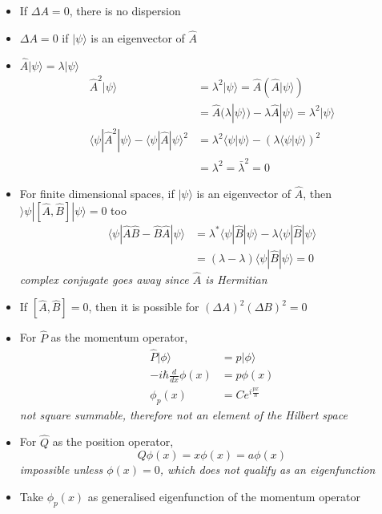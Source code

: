 \documentclass[a4paper,11pt,normalem]{article}
\begin{document}
\begin{itemize}
\item
  If \(\Delta A = 0\), there is no dispersion
\item
  \(\Delta A = 0\) if \(|\psi\rangle\) is an eigenvector of \(\hat{A}\)
\item
  \(\hat{A}|\psi\rangle = \lambda|\psi\rangle\)
\[
    \begin{aligned}
    \hat{A}^2|\psi\rangle &= \lambda^2|\psi\rangle = \hat{A}(\hat{A}|\psi\rangle) \\
    &= \hat{A}(\lambda|\psi\rangle) - \lambda\hat{A}|\psi\rangle = \lambda^2|\psi\rangle \\
    \langle\psi|\hat{A}^2|\psi\rangle - \langle\psi|\hat{A}|\psi\rangle^2 &= \lambda^2\langle\psi|\psi\rangle - (\lambda\langle\psi|\psi\rangle)^2 \\
    &= \lambda^2 = \bar{\lambda}^2 = 0
    \end{aligned}
\]
\item
  For finite dimensional spaces, if \(|\psi\rangle\) is an eigenvector
  of \(\hat{A}\), then \(\rangle\psi|[\hat{A},\hat{B}]|\psi\rangle = 0\)
  too
\[
    \begin{aligned}
    \langle\psi|\hat{A}\hat{B} - \hat{B}\hat{A}|\psi\rangle &= \lambda^* \langle\psi|\hat{B}|\psi\rangle - \lambda\langle\psi|\hat{B}|\psi\rangle \\
    &= (\lambda - \lambda)\langle\psi|\hat{B}|\psi\rangle = 0
    \end{aligned}
\]
\emph{complex conjugate goes away since \(\hat{A}\) is Hermitian}
\item
  If \([\hat{A},\hat{B}] = 0\), then it is possible for
  \((\Delta A)^2(\Delta B)^2 = 0\)
\item
  For \(\hat{P}\) as the momentum operator,
\[
    \begin{aligned}
    \hat{P}|\phi\rangle &= p|\phi\rangle \\
    -i\hbar \frac{d}{dx} \phi(x) &= p\phi(x) \\
    \phi_p(x) &= Ce^{i\frac{px}{\hbar}}
    \end{aligned}
\]
\emph{not square summable, therefore not an element of the Hilbert
space}
\item
  For \(\hat{Q}\) as the position operator,
\[
    Q\phi(x) = x\phi(x) = a\phi(x)
\]
\emph{impossible unless \(\phi(x) = 0\), which does not qualify as an
eigenfunction}
\item
  Take \(\phi_p(x)\) as generalised eigenfunction of the momentum
  operator
\end{itemize}
\end{document}
